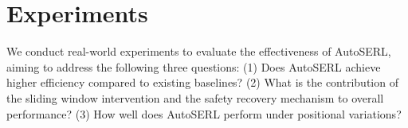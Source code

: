 \documentclass[runningheads]{llncs}
\begin{document}
\section{Experiments}

We conduct real-world experiments to evaluate the effectiveness of AutoSERL, aiming to address the following three questions:
(1) Does AutoSERL achieve higher efficiency compared to existing baselines?
(2) What is the contribution of the sliding window intervention and the safety recovery mechanism to overall performance?
(3) How well does AutoSERL perform under positional variations?



\end{document}
